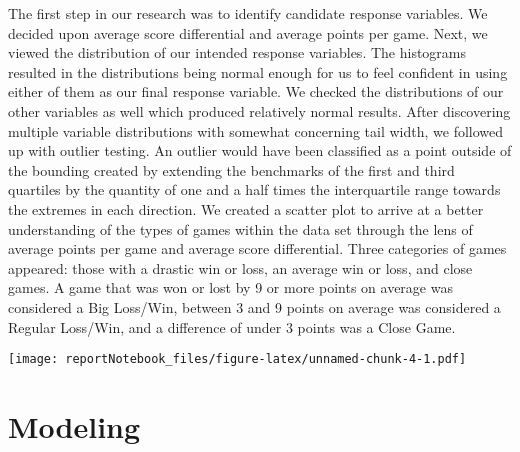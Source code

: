 \documentclass[
]{article}
\begin{document}
The first step in our research was to identify candidate response
variables. We decided upon average score differential and average points
per game. Next, we viewed the distribution of our intended response
variables. The histograms resulted in the distributions being normal
enough for us to feel confident in using either of them as our final
response variable. We checked the distributions of our other variables
as well which produced relatively normal results. After discovering
multiple variable distributions with somewhat concerning tail width, we
followed up with outlier testing. An outlier would have been classified
as a point outside of the bounding created by extending the benchmarks
of the first and third quartiles by the quantity of one and a half times
the interquartile range towards the extremes in each direction. We
created a scatter plot to arrive at a better understanding of the types
of games within the data set through the lens of average points per game
and average score differential. Three categories of games appeared:
those with a drastic win or loss, an average win or loss, and close
games. A game that was won or lost by 9 or more points on average was
considered a Big Loss/Win, between 3 and 9 points on average was
considered a Regular Loss/Win, and a difference of under 3 points was a
Close Game.

\texttt{[image: reportNotebook\_files/figure-latex/unnamed-chunk-4-1.pdf]}

\hypertarget{modeling}{%
\section{Modeling}\label{modeling}}
\end{document}
